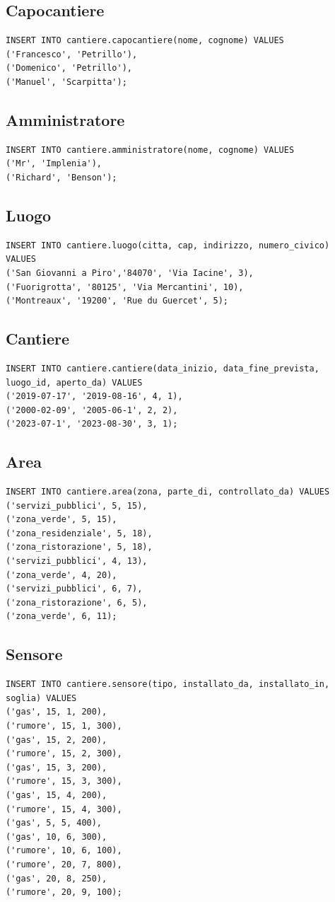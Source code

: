 \documentclass[11pt]{article}
\begin{document}
\subsection*{Capocantiere}
\label{sec:org9ab004d}
\begin{verbatim}
INSERT INTO cantiere.capocantiere(nome, cognome) VALUES
('Francesco', 'Petrillo'),
('Domenico', 'Petrillo'),
('Manuel', 'Scarpitta');
\end{verbatim}
\subsection*{Amministratore}
\label{sec:orgc869211}
\begin{verbatim}
INSERT INTO cantiere.amministratore(nome, cognome) VALUES
('Mr', 'Implenia'),
('Richard', 'Benson');
\end{verbatim}
\subsection*{Luogo}
\label{sec:org44bb169}
\begin{verbatim}
INSERT INTO cantiere.luogo(citta, cap, indirizzo, numero_civico) VALUES
('San Giovanni a Piro','84070', 'Via Iacine', 3),
('Fuorigrotta', '80125', 'Via Mercantini', 10),
('Montreaux', '19200', 'Rue du Guercet', 5);
\end{verbatim}
\subsection*{Cantiere}
\label{sec:org742fa40}
\begin{verbatim}
INSERT INTO cantiere.cantiere(data_inizio, data_fine_prevista, luogo_id, aperto_da) VALUES
('2019-07-17', '2019-08-16', 4, 1),
('2000-02-09', '2005-06-1', 2, 2),
('2023-07-1', '2023-08-30', 3, 1);
\end{verbatim}
\subsection*{Area}
\label{sec:orgd696960}
\begin{verbatim}
INSERT INTO cantiere.area(zona, parte_di, controllato_da) VALUES
('servizi_pubblici', 5, 15),
('zona_verde', 5, 15),
('zona_residenziale', 5, 18),
('zona_ristorazione', 5, 18),
('servizi_pubblici', 4, 13),
('zona_verde', 4, 20),
('servizi_pubblici', 6, 7),
('zona_ristorazione', 6, 5),
('zona_verde', 6, 11);
\end{verbatim}
\subsection*{Sensore}
\label{sec:orgf4bed6d}
\begin{verbatim}
INSERT INTO cantiere.sensore(tipo, installato_da, installato_in, soglia) VALUES
('gas', 15, 1, 200),
('rumore', 15, 1, 300),
('gas', 15, 2, 200),
('rumore', 15, 2, 300),
('gas', 15, 3, 200),
('rumore', 15, 3, 300),
('gas', 15, 4, 200),
('rumore', 15, 4, 300),
('gas', 5, 5, 400),
('gas', 10, 6, 300),
('rumore', 10, 6, 100),
('rumore', 20, 7, 800),
('gas', 20, 8, 250),
('rumore', 20, 9, 100);
\end{verbatim}
\end{document}
